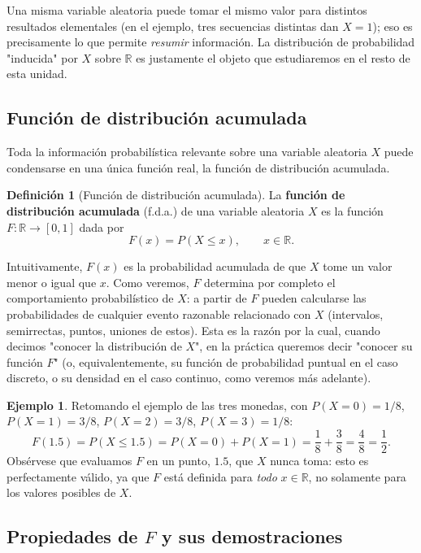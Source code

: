 \documentclass[11pt,a4paper]{article}
\theoremstyle{plain}
\theoremstyle{definition}
\newtheorem{definicion}[teorema]{Definición}
\newtheorem{ejemplo}[teorema]{Ejemplo}
\theoremstyle{remark}
\begin{document}
Una misma variable aleatoria puede tomar el mismo valor para distintos resultados elementales (en el ejemplo, tres secuencias distintas dan $X=1$); eso es precisamente lo que permite \emph{resumir} información. La distribución de probabilidad "inducida" por $X$ sobre $\mathbb{R}$ es justamente el objeto que estudiaremos en el resto de esta unidad.

\subsection{Función de distribución acumulada}

Toda la información probabilística relevante sobre una variable aleatoria $X$ puede condensarse en una única función real, la función de distribución acumulada.

\begin{definicion}[Función de distribución acumulada]
La \textbf{función de distribución acumulada} (f.d.a.) de una variable aleatoria $X$ es la función $F:\mathbb{R}\to[0,1]$ dada por
$$F(x)=P(X\le x),\qquad x\in\mathbb{R}.$$
\end{definicion}

Intuitivamente, $F(x)$ es la probabilidad acumulada de que $X$ tome un valor menor o igual que $x$. Como veremos, $F$ determina por completo el comportamiento probabilístico de $X$: a partir de $F$ pueden calcularse las probabilidades de cualquier evento razonable relacionado con $X$ (intervalos, semirrectas, puntos, uniones de estos). Esta es la razón por la cual, cuando decimos "conocer la distribución de $X$", en la práctica queremos decir "conocer su función $F$" (o, equivalentemente, su función de probabilidad puntual en el caso discreto, o su densidad en el caso continuo, como veremos más adelante).

\begin{ejemplo}
Retomando el ejemplo de las tres monedas, con $P(X=0)=1/8$, $P(X=1)=3/8$, $P(X=2)=3/8$, $P(X=3)=1/8$:
$$F(1.5)=P(X\le 1.5)=P(X=0)+P(X=1)=\frac{1}{8}+\frac{3}{8}=\frac{4}{8}=\frac{1}{2}.$$
Obsérvese que evaluamos $F$ en un punto, $1.5$, que $X$ nunca toma: esto es perfectamente válido, ya que $F$ está definida para \emph{todo} $x\in\mathbb{R}$, no solamente para los valores posibles de $X$.
\end{ejemplo}

\subsection{Propiedades de \texorpdfstring{$F$}{F} y sus demostraciones}
\end{document}
